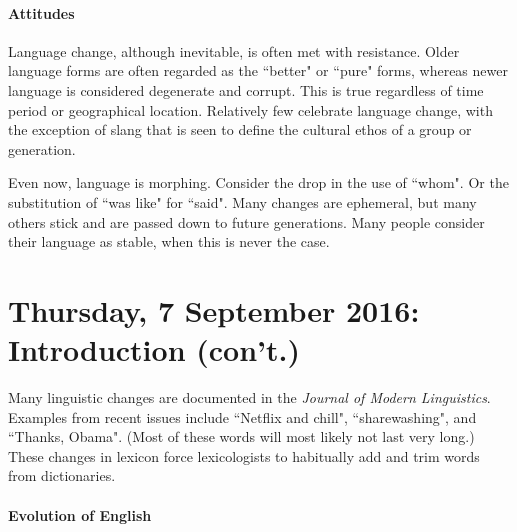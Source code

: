 \documentclass{exam}
\begin{document}
\paragraph{Attitudes} Language change, although inevitable, is often met with resistance. 
Older language forms are often regarded as the ``better" or ``pure" forms, whereas newer language is considered degenerate and corrupt. 
This is true regardless of time period or geographical location. 
Relatively few celebrate language change, with the exception of slang that is seen to define the cultural ethos of a group or generation. 
\par Even now, language is morphing. 
Consider the drop in the use of ``whom".
Or the substitution of ``was like" for ``said". Many changes are ephemeral, but many others stick and are passed down to future generations. Many people consider their language as stable, when this is never the case. 



\section*{Thursday, 7 September 2016: Introduction (con't.)}

Many linguistic changes are documented in the \textit{Journal of Modern Linguistics}. Examples from recent issues include ``Netflix and chill", ``sharewashing", and ``Thanks, Obama". 
(Most of these words will most likely not last very long.) 
These changes in lexicon force lexicologists to habitually add and trim words from dictionaries. 

\begin{center} 
\paragraph{Evolution of English }
\end{center}
\end{document}
